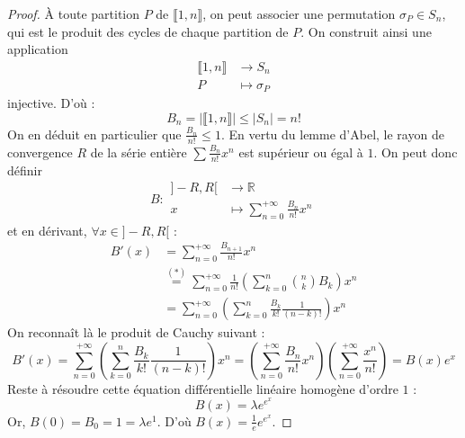 \begin{proof}
		À toute partition $P$ de $\llbracket 1, n \rrbracket$, on peut associer une permutation $\sigma_P \in S_n$, qui est le produit des cycles de chaque partition de $P$. On construit ainsi une application
		\[
		\begin{array}{cl}
			\llbracket 1, n \rrbracket &\rightarrow S_n \\
			P &\mapsto \sigma_P
		\end{array}
		\]
		injective. D'où :
		\[ B_n = |\llbracket 1, n \rrbracket| \leq |S_n| = n! \]
		On en déduit en particulier que $\frac{B_n}{n!} \leq 1$. En vertu du lemme d'Abel, le rayon de convergence $R$ de la série entière $\sum \frac{B_n}{n!} x^n$ est supérieur ou égal à $1$. On peut donc définir
		\[
		B :
		\begin{array}{cl}
			]-R,R[ &\rightarrow \mathbb{R} \\
			x &\mapsto \sum_{n=0}^{+\infty} \frac{B_n}{n!} x^n
		\end{array}
		\]
		et en dérivant, $\forall x \in ]-R,R[$ :
		\begin{align*}
			B'(x) &= \sum_{n=0}^{+\infty} \frac{B_{n+1}}{n!} x^n \\
			&\overset{(*)}{=} \sum_{n=0}^{+\infty} \frac{1}{n!} \left( \sum_{k=0}^n \binom{n}{k} B_k \right) x^n \\
			&= \sum_{n=0}^{+\infty} \left( \sum_{k=0}^n \frac{B_k}{k!} \frac{1}{(n-k)!} \right) x^n
		\end{align*}
		On reconnaît là le produit de Cauchy suivant :
		\[ B'(x) = \sum_{n=0}^{+\infty} \left( \sum_{k=0}^n \frac{B_k}{k!} \frac{1}{(n-k)!} \right) x^n = \left( \sum_{n=0}^{+\infty} \frac{B_n}{n!} x^n \right) \left( \sum_{n=0}^{+\infty} \frac{x^n}{n!} \right) = B(x) e^x \]
		Reste à résoudre cette équation différentielle linéaire homogène d'ordre $1$ :
		\[ B(x) = \lambda e^{e^x} \]
		Or, $B(0) = B_0 = 1 = \lambda e^1$. D'où $B(x) = \frac{1}{e} e^{e^x}$.


\end{proof}
